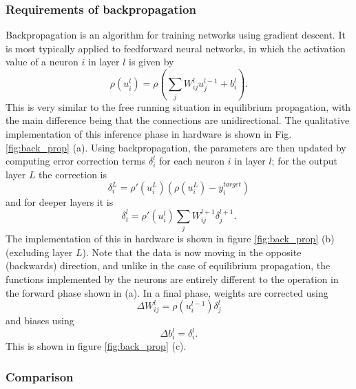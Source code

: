 \documentclass[utf8]{frontiersSCNS}
\begin{document}

\subsubsection{Requirements of backpropagation}

Backpropagation is an algorithm for training networks using gradient descent. It is 
most typically applied to feedforward neural networks, in which the activation value of a neuron 
$i$ in layer $l$ is given by $$\rho(u_i^l)=\rho(\sum_jW_{ij}^lu_j^{l-1}+b_i^l).$$ This
is very similar to the free running situation in equilibrium propagation, with the main difference 
being that the connections are unidirectional. The qualitative implementation of this inference
phase in hardware is shown in Fig. \ref{fig:back_prop} (a). Using backpropagation, the 
parameters are then updated by computing error
correction terms $\delta_i^l$ for each neuron $i$ in layer $l$; for the output layer $L$ the 
correction is $$\delta_i^L=\rho'(u_i^L)(\rho(u_i^L)-y_i^{target})$$ and for deeper layers it is
$$\delta_i^l=\rho'(u_i^l)\sum_jW_{ij}^{l+1}\delta_j^{l+1}.$$ The implementation of 
this in hardware is shown in figure \ref{fig:back_prop} (b) (excluding layer $L$). Note that the data
is now moving in the opposite (backwards) direction, and unlike in the case of equilibrium 
propagation, the functions implemented by the neurons are entirely different to the operation in 
the forward phase shown in (a). In a final phase, weights are corrected using $$\Delta 
W_{ij}^l=\rho(u_i^{l-1})\delta_j^l$$ and biases using 
$$\Delta b_i^l=\delta_i^l.$$ This is shown in figure \ref{fig:back_prop} (c).


\subsubsection{Comparison}
\end{document}
